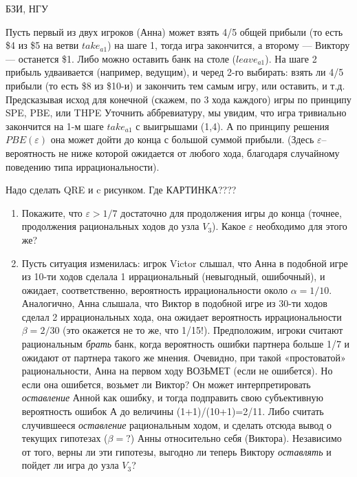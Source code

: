 \begin{problem}
\begin{source}
БЗИ, НГУ
\end{source}
Пусть первый из двух игроков (Анна) может взять 4/5 общей
прибыли (то есть \$4 из \$5 на ветви $take_{a1}$) на шаге
1, тогда игра закончится, а второму — Виктору — останется
\$1. Либо можно оставить банк на столе ($leave_{a1}$). На
шаге 2 прибыль удваивается (например, ведущим), и черед
2-го выбирать: взять ли 4/5 прибыли (то есть \$8 из \$10-и)
и закончить тем самым игру, или оставить, и т.д.
Предсказывая исход для конечной (скажем, по 3 хода каждого)
игры по принципу SPE, PBE, или THPE {\red Уточнить аббревиатуру}, мы увидим, что игра
тривиально закончится на 1-м шаге $take_{a1}$ с выигрышами
(1,4). А по принципу решения $PBE(\varepsilon)$ она может
дойти до конца с большой суммой прибыли. (Здесь
$\varepsilon$-- вероятность не ниже которой ожидается от
любого хода, благодаря случайному поведению типа
иррациональности).

{\red Надо сделать QRE и c рисунком. Где КАРТИНКА????}

\begin{enumerate}
\item Покажите, что $\varepsilon >1/7$ достаточно для продолжения
игры до конца (точнее, продолжения рациональных ходов до
узла $V_3$). Какое $\varepsilon$ необходимо для этого же?

\item Пусть ситуация изменилась: игрок Victor слышал, что Анна
в подобной игре из 10-ти ходов сделала 1 иррациональный
(невыгодный, ошибочный), и ожидает, соответственно,
вероятность иррациональности около $\alpha= 1/10$.
Аналогично,  Анна слышала, что Виктор в подобной игре из
30-ти ходов сделал 2 иррациональных хода, она ожидает
вероятность иррациональности $\beta= 2/30$ (это окажется не
то же, что 1/15!). Предположим, игроки считают рациональным
{\em брать} банк, когда вероятность ошибки партнера больше
1/7 и ожидают от партнера такого же мнения. Очевидно, при
такой «простоватой» рациональности, Анна на первом ходу
ВОЗЬМЕТ (если не ошибется). Но если она ошибется, возьмет ли
Виктор? Он может интерпретировать {\em оставление} Анной
как ошибку, и тогда подправить свою субъективную
вероятность ошибок А до величины (1+1)/(10+1)=2/11. Либо
считать случившееся {\em оставление} рациональным ходом, и
сделать отсюда вывод о текущих гипотезах ($\beta=?$) Анны
относительно себя (Виктора). Независимо от того, верны ли
эти гипотезы, выгодно ли теперь Виктору {\em оставлять} и
пойдет ли игра до узла $V_3$?


\end{enumerate}
\end{problem}

